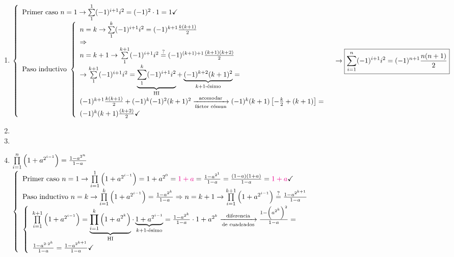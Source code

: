 \documentclass[12pt,a4paper, spanish]{article}
\begin{document}
\ejercicio
\begin{enumerate}[label=\roman*)]
	\item $\llave{ l }{
			      \text{Primer caso } n = 1 \to \sumatoria{1}{1} (-1)^{i+1} i^2 = (-1)^2 \cdot 1 = 1 \checkmark\\
			      \text{Paso inductivo }
			      \llave{ l }{
				      n = k \to \sumatoria{1}{k} (-1)^{i+1} i^2 = (-1)^{k+1} \frac{k(k+1)}{2} \\
				      \entonces\\
				      n = k+1 \to \sumatoria{1}{k+1}  (-1)^{i+1} i^2 \eq?= (-1)^{(k+1)+1} \frac{(k+1)(k+2)}{2}\\
				      \to \sumatoria{1}{k+1}  (-1)^{i+1} i^2 =
				      \HI{
					      \sumatoria{1}{k} (-1)^{i+1} i^2
				      } +
				      \kmasuno{
					      (-1)^{k+2} (k+1)^2
				      } =\\
				      (-1)^{k+1} \frac{k(k+1)}{2} + (-1)^k (-1)^2 (k+1)^2 \flecha{acomodar}[fáctor cómun] (-1)^k (k+1)\left[ -\frac{k}{2} + (k+1) \right] =\\
				      (-1)^k (k+1)\frac{(k+2)}{2} \checkmark
			      }
		      }\\ \to
		      \boxed{\sumatoria{i=1}{n} (-1)^{i+1} i^2 = (-1)^{n+1} \frac{n(n+1)}{2}}
	      $

	\item
	      \hacer

	\item
	      \hacer

	\item
	      $\prod\limits_{i=1}^{n} \left(  1 + a^{2^{i-1}}  \right) = \frac{1-a^{2^n}}{1-a}$\\
	      $\llave{l}{
		      \text{Primer caso } n = 1 \to \productoria{i=1}{1} \parentesis{ 1 + a^{2^{i-1}} } = 1 + a^{2^0} = \magenta{$1 + a$} = \frac{1-a^{2^1}}{1 - a} = \frac{(1-a)(1+a)}{1-a} = \magenta{$1 + a$} \checkmark \\
		      \text{Paso inductivo } n = k \to \productoria{i=1}{k} \parentesis{ 1 + a^{2^{i-1}} } = \frac{1-a^{2^k}}{1-a} \entonces n = k+1 \to  \productoria{i=1}{k+1} \parentesis{ 1 + a^{2^{i-1}} } \eq?= \frac{1-a^{2^{k+1}}}{1-a}\\
		      \llave{l}{
		      \productoria{i=1}{k+1} \parentesis{ 1 + a^{2^{i-1}} } =
		      \HI{ 
          \productoria{i=1}{k} \parentesis{ 1 + a^{2^k}}
          } \cdot 
          \kmasuno{
            1 + a^{2^{i-1}}
          }  =
		      \frac{1-a^{2^k}}{1-a} \cdot 1 + a^{2^k} \flecha{diferencia}[de cuadrados] \frac{1 - \parentesis{ a^{2^k}}^2}{1-a} =\\
		      \frac{1 - a^{2 \cdot 2^k}}{1-a} = \frac{1 - a^{2^{k+1}}}{1-a}\checkmark
		      }
		      }
	      $




\end{enumerate}
\end{document}
